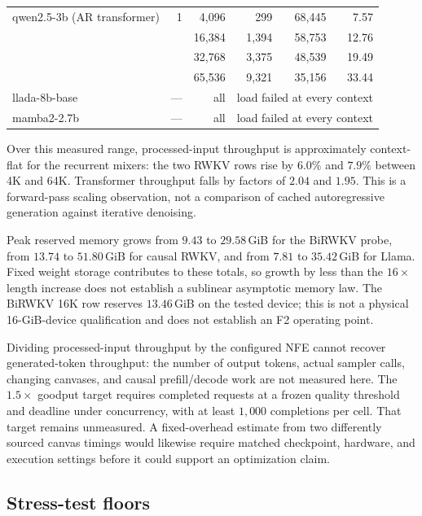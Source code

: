 \begin{table}[t]
\begin{tabular}{@{}lrrrrr@{}}
\midrule
qwen2.5-3b (AR transformer) & 1 & 4{,}096 & 299 & 68{,}445 & 7.57\\
 & & 16{,}384 & 1{,}394 & 58{,}753 & 12.76\\
 & & 32{,}768 & 3{,}375 & 48{,}539 & 19.49\\
 & & 65{,}536 & 9{,}321 & 35{,}156 & 33.44\\
\midrule
llada-8b-base & --- & all & \multicolumn{3}{c}{load failed at every context}\\
mamba2-2.7b & --- & all & \multicolumn{3}{c}{load failed at every context}\\
\bottomrule
\end{tabular}
\label{tab:systems}
\end{table}

Over this measured range, processed-input throughput is approximately context-flat
for the recurrent mixers: the two RWKV rows rise by $6.0\%$ and $7.9\%$ between 4K
and 64K. Transformer throughput falls by factors of $2.04$ and $1.95$. This is a
forward-pass scaling observation, not a comparison of cached autoregressive generation
against iterative denoising.

Peak reserved memory grows from $9.43$ to $29.58$\,GiB for the BiRWKV probe, from
$13.74$ to $51.80$\,GiB for causal RWKV, and from $7.81$ to $35.42$\,GiB for Llama.
Fixed weight storage contributes to these totals, so growth by less than the $16\times$
length increase does not establish a sublinear asymptotic memory law. The BiRWKV 16K
row reserves $13.46$\,GiB on the tested device; this is not a physical 16-GiB-device
qualification and does not establish an F2 operating point.

Dividing processed-input throughput by the configured NFE cannot recover generated-token
throughput: the number of output tokens, actual sampler calls, changing canvases, and
causal prefill/decode work are not measured here. The $1.5\times$ goodput target requires
completed requests at a frozen quality threshold and deadline under concurrency, with
at least $1{,}000$ completions per cell. That target remains unmeasured. A fixed-overhead
estimate from two differently sourced canvas timings would likewise require matched
checkpoint, hardware, and execution settings before it could support an optimization
claim.

\subsection{Stress-test floors}
\label{m:floors}

